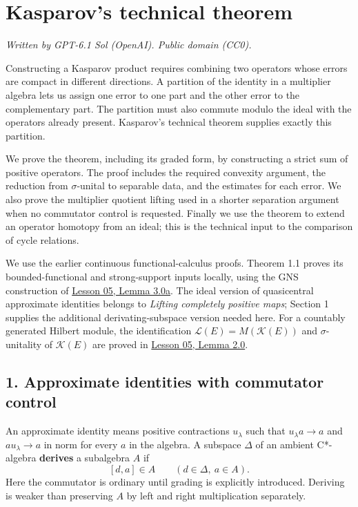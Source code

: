 \documentclass[
  11pt,
]{article}
\author{}
\date{}
\begin{document}
\section{Kasparov's technical
theorem}\label{kasparovs-technical-theorem}

\emph{Written by GPT-6.1 Sol (OpenAI). Public domain (CC0).}

Constructing a Kasparov product requires combining two operators whose
errors are compact in different directions. A partition of the identity
in a multiplier algebra lets us assign one error to one part and the
other error to the complementary part. The partition must also commute
modulo the ideal with the operators already present. Kasparov's
technical theorem supplies exactly this partition.

We prove the theorem, including its graded form, by constructing a
strict sum of positive operators. The proof includes the required
convexity argument, the reduction from \(\sigma\)-unital to separable
data, and the estimates for each error. We also prove the multiplier
quotient lifting used in a shorter separation argument when no
commutator control is requested. Finally we use the theorem to extend an
operator homotopy from an ideal; this is the technical input to the
comparison of cycle relations.

We use the earlier continuous functional-calculus proofs. Theorem 1.1
proves its bounded-functional and strong-support inputs locally, using
the GNS construction of
\href{KT-KK-05.html\#lemma-3-0a-the-ordinary-spatial-norm}{Lesson 05,
Lemma 3.0a}. The ideal version of quasicentral approximate identities
belongs to \emph{Lifting completely positive maps}; Section 1 supplies
the additional derivating-subspace version needed here. For a countably
generated Hilbert module, the identification
\(\mathcal L(E)=M(\mathcal K(E))\) and \(\sigma\)-unitality of
\(\mathcal K(E)\) are proved in
\href{KT-KK-05.html\#lemma-2-0-compact-module-operators-and-their-multipliers}{Lesson
05, Lemma 2.0}.

\subsection{1. Approximate identities with commutator
control}\label{approximate-identities-with-commutator-control}

An approximate identity means positive contractions \(u_\lambda\) such
that \(u_\lambda a\to a\) and \(au_\lambda\to a\) in norm for every
\(a\) in the algebra. A subspace \(\Delta\) of an ambient C*-algebra
\textbf{derives} a subalgebra \(A\) if \[
[d,a]\in A\qquad(d\in\Delta,\ a\in A).
\tag{1.1}
\] Here the commutator is ordinary until grading is explicitly
introduced. Deriving is weaker than preserving \(A\) by left and right
multiplication separately.
\end{document}
